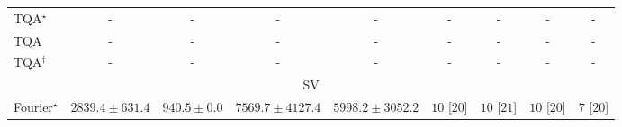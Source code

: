 \begin{tabular}{l|cccc|cccc|}
TQA$^\star$ & {\cellcolor[HTML]{000000}} \color[HTML]{F1F1F1} {\cellcolor{white}} \color{black} - & {\cellcolor[HTML]{000000}} \color[HTML]{F1F1F1} {\cellcolor{white}} \color{black} - & {\cellcolor[HTML]{000000}} \color[HTML]{F1F1F1} {\cellcolor{white}} \color{black} - & {\cellcolor[HTML]{000000}} \color[HTML]{F1F1F1} {\cellcolor{white}} \color{black} - & {\cellcolor[HTML]{000000}} \color[HTML]{F1F1F1} {\cellcolor{white}} \color{black} - & {\cellcolor[HTML]{000000}} \color[HTML]{F1F1F1} {\cellcolor{white}} \color{black} - & {\cellcolor[HTML]{000000}} \color[HTML]{F1F1F1} {\cellcolor{white}} \color{black} - & {\cellcolor[HTML]{000000}} \color[HTML]{F1F1F1} {\cellcolor{white}} \color{black} - \\
TQA & {\cellcolor[HTML]{000000}} \color[HTML]{F1F1F1} {\cellcolor{white}} \color{black} - & {\cellcolor[HTML]{000000}} \color[HTML]{F1F1F1} {\cellcolor{white}} \color{black} - & {\cellcolor[HTML]{000000}} \color[HTML]{F1F1F1} {\cellcolor{white}} \color{black} - & {\cellcolor[HTML]{000000}} \color[HTML]{F1F1F1} {\cellcolor{white}} \color{black} - & {\cellcolor[HTML]{000000}} \color[HTML]{F1F1F1} {\cellcolor{white}} \color{black} - & {\cellcolor[HTML]{000000}} \color[HTML]{F1F1F1} {\cellcolor{white}} \color{black} - & {\cellcolor[HTML]{000000}} \color[HTML]{F1F1F1} {\cellcolor{white}} \color{black} - & {\cellcolor[HTML]{000000}} \color[HTML]{F1F1F1} {\cellcolor{white}} \color{black} - \\
TQA$^\dagger$ & {\cellcolor[HTML]{000000}} \color[HTML]{F1F1F1} {\cellcolor{white}} \color{black} - & {\cellcolor[HTML]{000000}} \color[HTML]{F1F1F1} {\cellcolor{white}} \color{black} - & {\cellcolor[HTML]{000000}} \color[HTML]{F1F1F1} {\cellcolor{white}} \color{black} - & {\cellcolor[HTML]{000000}} \color[HTML]{F1F1F1} {\cellcolor{white}} \color{black} - & {\cellcolor[HTML]{000000}} \color[HTML]{F1F1F1} {\cellcolor{white}} \color{black} - & {\cellcolor[HTML]{000000}} \color[HTML]{F1F1F1} {\cellcolor{white}} \color{black} - & {\cellcolor[HTML]{000000}} \color[HTML]{F1F1F1} {\cellcolor{white}} \color{black} - & {\cellcolor[HTML]{000000}} \color[HTML]{F1F1F1} {\cellcolor{white}} \color{black} - \\
\cline{1-9}
\multicolumn{9}{c}{\rule{0pt}{8pt}SV} \\
\midrule
Fourier$^\star$ & {\cellcolor[HTML]{C4CBE3}} \color[HTML]{000000} $2839.4\pm 631.4$ & {\cellcolor[HTML]{FFF7FB}} \color[HTML]{000000} $940.5\pm 0.0$ & {\cellcolor[HTML]{023858}} \color[HTML]{F1F1F1} $7569.7\pm 4127.4$ & {\cellcolor[HTML]{056DAC}} \color[HTML]{F1F1F1} $5998.2\pm 3052.2$ & {\cellcolor[HTML]{49006A}} \color[HTML]{F1F1F1} $10$ [$20$] & {\cellcolor[HTML]{49006A}} \color[HTML]{F1F1F1} $10$ [$21$] & {\cellcolor[HTML]{49006A}} \color[HTML]{F1F1F1} $10$ [$20$] & {\cellcolor[HTML]{CD238F}} \color[HTML]{F1F1F1} $7$ [$20$] \\

\end{tabular}
